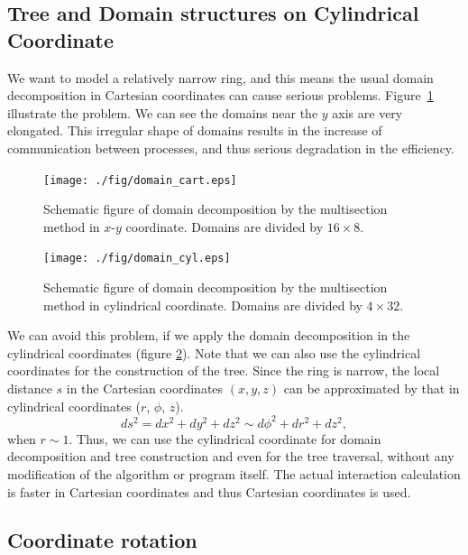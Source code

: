 \documentclass[conference]{IEEEtran}
\begin{document}
\subsection{Tree and Domain structures on Cylindrical Coordinate}
\label{subsec:cylcoord}

We want to model a relatively narrow ring, and this means the usual
domain decomposition in Cartesian coordinates can cause serious
problems. Figure~\ref{fig:domain_cart} illustrate the problem. We
can see the domains near the $y$ axis are very elongated. This
irregular shape of domains results in the increase of communication
between processes, and thus serious degradation in the efficiency. 

\begin{figure}
  \centering \texttt{[image: ./fig/domain\_cart.eps]}
  \caption{Schematic figure of domain decomposition by the multisection
    method in $x$-$y$ coordinate. Domains are divided by $16 \times 8$.}
  \label{fig:domain_cart}
\end{figure}

\begin{figure}
  \centering
    \texttt{[image: ./fig/domain\_cyl.eps]}
  \caption{Schematic figure of domain decomposition by the multisection
    method in cylindrical coordinate. Domains are divided by $4 \times 32$.}
  \label{fig:domain_cyl}
\end{figure}

We can avoid this problem, if we apply the domain decomposition 
in the  cylindrical coordinates (figure  \ref{fig:domain_cyl}).
Note that we can also use the  cylindrical coordinates for the
construction of the tree.  Since
the ring is narrow, the local distance $s$ in the Cartesian coordinates
$(x, y, z)$ can be approximated by that in cylindrical coordinates
($r$, $\phi$, $z$).
\begin{equation}
  \label{eq:metric}
  ds^2 = dx^2 + dy^2 + dz^2 \sim d\phi ^2 + dr^2 + dz^2,
\end{equation}
when $r \sim 1$. Thus,
we can use the cylindrical coordinate
for domain decomposition and tree
construction and even for the tree traversal,  without any modification of the algorithm or program
itself. The actual interaction calculation is faster in Cartesian
coordinates and thus Cartesian coordinates is used.


\subsection{Coordinate rotation}
\label{subsec:exptcl}
\end{document}
